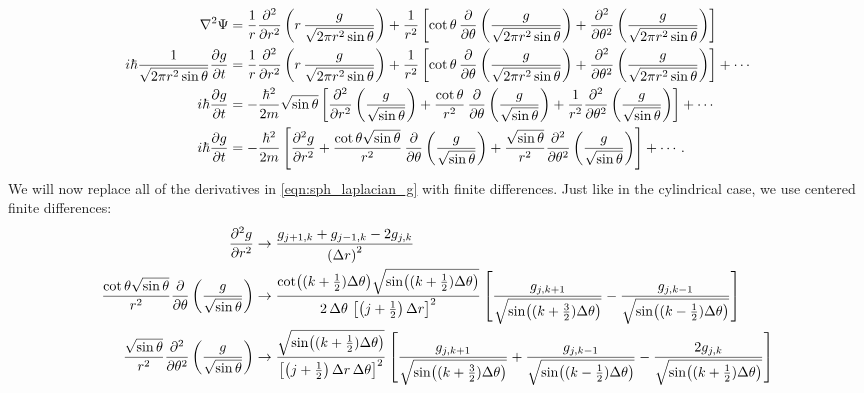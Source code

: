 \documentclass[12pt]{article}
\numberwithin{equation}{section}
\begin{document}
\begin{align}\label{eqn:sph_laplacian_g}
\laplacian{\Psi} &= \frac{1}{r} \pdv[2]{}{r} \left(r \, \frac{g}{\sqrt{2 \pi r^2 \sin{\theta}}}\right) + \frac{1}{r^2} \left[\cot{\theta} \, \pdv{}{\theta}\left(\frac{g}{\sqrt{2 \pi r^2 \sin{\theta}}}\right) + \pdv[2]{}{\theta}\left(\frac{g}{\sqrt{2 \pi r^2 \sin{\theta}}}\right)\right] \nonumber \\
%
i \hbar \frac{1}{\sqrt{2 \pi r^2 \sin\theta}} \pdv{g}{t} &= \frac{1}{r} \pdv[2]{}{r} \left(r \, \frac{g}{\sqrt{2 \pi r^2 \sin{\theta}}}\right) + \frac{1}{r^2} \left[\cot{\theta} \, \pdv{}{\theta}\left(\frac{g}{\sqrt{2 \pi r^2 \sin{\theta}}}\right) + \pdv[2]{}{\theta}\left(\frac{g}{\sqrt{2 \pi r^2 \sin{\theta}}}\right)\right] + \cdots \nonumber \\
%
i \hbar \pdv{g}{t} &= -\frac{\hbar^2}{2m} \sqrt{\sin{\theta}} \left[\pdv[2]{}{r} \left(\frac{g}{\sqrt{\sin{\theta}}}\right) + \frac{\cot{\theta}}{r^2} \, \pdv{}{\theta}\left(\frac{g}{\sqrt{\sin{\theta}}}\right) + \frac{1}{r^2}\pdv[2]{}{\theta}\left(\frac{g}{\sqrt{\sin{\theta}}}\right)\right] + \cdots \nonumber \\
i \hbar \pdv{g}{t} &= -\frac{\hbar^2}{2m} \left[\pdv[2]{g}{r} +\frac{\cot{\theta} \sqrt{\sin{\theta}}}{r^2} \, \pdv{}{\theta}\left(\frac{g}{\sqrt{\sin{\theta}}}\right) + \frac{\sqrt{\sin{\theta}}}{r^2}\pdv[2]{}{\theta}\left(\frac{g}{\sqrt{\sin{\theta}}}\right)\right] + \cdots.
\end{align}
We will now replace all of the derivatives in \eqref{eqn:sph_laplacian_g} with finite differences. Just like in the cylindrical case, we use centered finite differences:
\begin{align}\label{eqn:sph_finite_differences}
\pdv[2]{g}{r} &\rightarrow \frac{g_{j+1, k} + g_{j-1, k} - 2g_{j,k}}{\left(\Delta r\right)^2} \\
%
\frac{\cot{\theta} \sqrt{\sin{\theta}}}{r^2}\pdv{}{\theta}\left(\frac{g}{\sqrt{\sin{\theta}}}\right) &\rightarrow 
\frac{\cot((k+\frac{1}{2}) \Delta \theta) \sqrt{\sin((k+\frac{1}{2}) \Delta \theta)}}{2 \, \Delta \theta \, \left[\left(j+\frac{1}{2}\right) \Delta r\right]^2} \left[  \frac{g_{j, k+1}}{\sqrt{\sin((k+\frac{3}{2}) \Delta \theta)}} - \frac{g_{j, k-1}}{\sqrt{\sin((k-\frac{1}{2}) \Delta \theta)}}   \right] \nonumber \\
%
\frac{\sqrt{\sin{\theta}}}{r^2}\pdv[2]{}{\theta}\left(\frac{g}{\sqrt{\sin{\theta}}}\right) &\rightarrow  
\frac{\sqrt{\sin((k+\frac{1}{2}) \Delta \theta)}}{\left[\left(j+\frac{1}{2}\right) \Delta r \, \Delta \theta\right]^2} \left[  \frac{g_{j, k+1}}{\sqrt{\sin((k+\frac{3}{2}) \Delta \theta)}} + \frac{g_{j, k-1}}{\sqrt{\sin((k-\frac{1}{2}) \Delta \theta)}} - \frac{2g_{j, k}}{\sqrt{\sin((k+\frac{1}{2}) \Delta \theta)}}  \right] \nonumber
\end{align}
\end{document}
